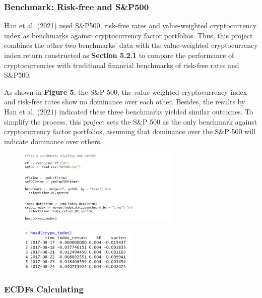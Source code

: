 \documentclass{article}
\begin{document}
\hypertarget{Set Benchmark: Risk-free and S\&P500}{%
\subsubsection{Benchmark: Risk-free and S\&P500}\label{Set Benchmark: Risk free and SP500}}
Han et al. (2021) used S\&P500, risk-free rates and value-weighted cryptocurrency index as benchmarks against cryptocurrency factor portfolios. Thus, this project combines the other two benchmarks' data with the value-weighted cryptocurrency index return constructed as {\bf Section 5.2.1} to compare the performance of cryptocurrencies with traditional financial benchmarks of risk-free rates and S\&P500. 

As shown in {\bf Figure 5}, the S\&P 500, the value-weighted cryptocurrency index and risk-free rates show no dominance over each other. Besides, the results by Han et al. (2021) indicated these three benchmarks yielded similar outcomes. To simplify the process, this project sets the S\&P 500 as the only benchmark against cryptocurrency factor portfolios, assuming that dominance over the S\&P 500 will indicate dominance over others.  


\begin{figure}[h]
    \centering
    \includegraphics[width=0.7\textwidth]{6.png}
    \label{fig:example}
\end{figure}
\begin{figure}[h]
    \flushleft
    \hspace{2em}
    \includegraphics[width=0.5\textwidth]{7.png}
    \label{fig:example}
\end{figure}


\hypertarget{ECDFs Calculating}{%
\subsubsection{ECDFs Calculating}\label{ECDFs Calculating}}
\end{document}

